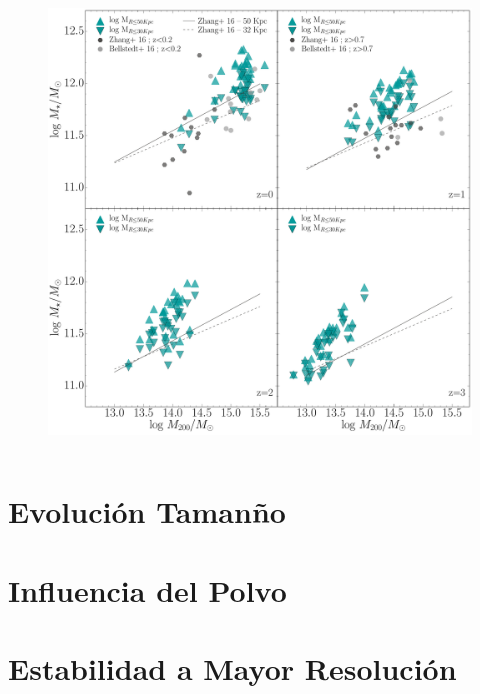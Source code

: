 \begin{figure}[H]
\centering
\includegraphics[height=12cm,width=12cm]{Figures/LR/zhang_vs_z.pdf}
\caption[zhang]{}
\label{fig:zhang}
\end{figure}

\section{Evoluci\'on Taman\~no}
\section{Influencia del Polvo}
\section{Estabilidad a Mayor Resoluci\'on}
